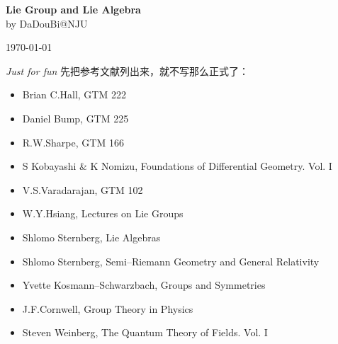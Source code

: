 \documentclass[8pt]{book}
\theoremstyle{plain}
\begin{document}
\frontmatter
\thispagestyle{empty}
\begin{flushright}
{\Huge\bfseries Lie Group and Lie Algebra}\\[\baselineskip]
{by DaDouBi@NJU}\par
\today
\end{flushright}
\vfill
{\Large\itshape Just for fun}
\clearpage
先把参考文献列出来，就不写那么正式了：
\begin{itemize}

\item Brian C.Hall, GTM 222

\item Daniel Bump, GTM 225

\item R.W.Sharpe, GTM 166

\item S Kobayashi \& K Nomizu, Foundations of Differential Geometry. Vol. I

\item V.S.Varadarajan, GTM 102

\item W.Y.Hsiang, Lectures on Lie Groups

\item Shlomo Sternberg, Lie Algebras

\item Shlomo Sternberg, Semi--Riemann Geometry and General Relativity

\item Yvette Kosmann--Schwarzbach, Groups and Symmetries

\item J.F.Cornwell, Group Theory in Physics

\item Steven Weinberg, The Quantum Theory of Fields. Vol. I

\end{itemize}
\mainmatter
\end{document}
